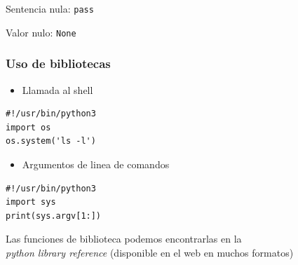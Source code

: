 \documentclass{beamer}
\begin{document}
\begin{frame}[fragile]
 
Sentencia nula: \verb|pass|

Valor nulo: \verb|None| 

\end{frame}


\begin{frame}[fragile]
\frametitle{Uso de bibliotecas}



\begin{itemize}
\item  Llamada al shell
\end{itemize}


  \begin{footnotesize}
\begin{verbatim}
#!/usr/bin/python3
import os
os.system('ls -l')
\end{verbatim}
  \end{footnotesize}

\begin{itemize}
\item Argumentos de linea de comandos
\end{itemize}



  \begin{footnotesize}
\begin{verbatim}
#!/usr/bin/python3
import sys
print(sys.argv[1:])

\end{verbatim}
  \end{footnotesize}
Las funciones de biblioteca podemos encontrarlas
en la \\\emph{python library reference}
(disponible en el web en muchos formatos)
\end{frame}








\end{document}
